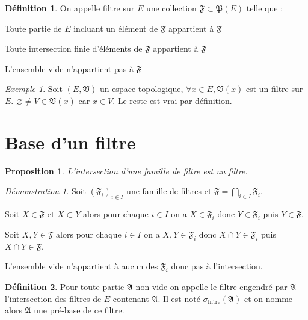 \documentclass[a4paper, 11pt, french]{book}
\newenvironment{itemise}{\itemize}{\enditemize}
\theoremstyle{plain} %
\newtheorem{proposition}{Proposition}
\theoremstyle{definition} %
\newtheorem{definition}{Définition}
\theoremstyle{remark} %
\newtheorem{exemple}{Exemple}
\newtheorem*{demonstration}{Démonstration}
\newcommand{\1}{\mathds{1}}
\newcommand\vide{\varnothing}
\renewcommand{\frak}[1]{\mathfrak{#1}}
\renewcommand{\rm}[1]{\mathrm{#1}}
\begin{document}
\begin{definition}
	On appelle filtre sur $E$ une collection $\frak{F}\subset\frak{P}(E)$ telle que :
	\begin{itemise}
		\item Toute partie de $E$ incluant un élément de $\frak{F}$ appartient à $\frak{F}$
		\item Toute intersection finie d'éléments de $\frak{F}$ appartient à $\frak{F}$
		\item L'ensemble vide n'appartient pas à $\frak{F}$
	\end{itemise}
\end{definition}

\begin{exemple}
	Soit $(E, \frak{V})$ un espace topologique, $\forall x\in E, \frak{V}(x)$ est un filtre sur $E$.
	$\vide\neq V\in\frak{V}(x)$ car $x\in V$.
	Le reste est vrai par définition.
\end{exemple}

\section{Base d'un filtre}

\begin{proposition}
	L'intersection d'une famille de filtre est un filtre.
\end{proposition}

\begin{demonstration}
	Soit $(\frak{F}_i)_{i\in I}$ une famille de filtres et $\frak{F}=\bigcap_{i\in I}\frak{F}_i$.
	\begin{itemise}
		\item Soit $X\in\frak{F}$ et $X\subset Y$ alors pour chaque $i\in I$ on a $X\in\frak{F}_i$ donc $Y\in\frak{F}_i$ puis $Y\in\frak{F}$.
		\item Soit $X, Y\in\frak{F}$ alors pour chaque $i\in I$ on a $X, Y\in\frak{F}_i$ donc $X\cap Y\in\frak{F}_i$ puis $X\cap Y\in\frak{F}$.
		\item L'ensemble vide n'appartient à aucun des $\frak{F}_i$ donc pas à l'intersection.
	\end{itemise}
\end{demonstration}

\begin{definition}
	Pour toute partie $\frak{A}$ non vide on appelle le filtre engendré par $\frak{A}$ l'intersection des filtres de $E$ contenant $\frak{A}$.
	Il est noté $\sigma_\rm{filtre}(\frak{A})$ et on nomme alors $\frak{A}$ une pré-base de ce filtre.
\end{definition}
\end{document}
